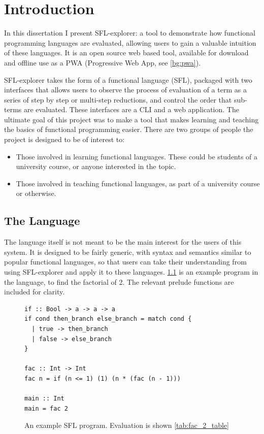 \chapter{Introduction}
\label{chap:context}
In this dissertation I present SFL-explorer: a tool to demonstrate how functional programming languages are evaluated, allowing users to gain a valuable intuition of these languages. It is an open source web based tool, available for download and offline use as a PWA (Progressive Web App, see \ref{bg:pwa}). 

SFL-explorer takes the form of a functional language (\ac{SFL}), packaged with two interfaces that allows users to observe the process of evaluation of a term as a series of step by step or multi-step reductions, and control the order that sub-terms are evaluated. These interfaces are a \ac{CLI} and a web application. The ultimate goal of this project was to make a tool that makes learning and teaching the basics of functional programming easier. There are two groups of people the project is designed to be of interest to:
\begin{itemize}
    \item Those involved in learning functional languages. These could be students of a university course, or anyone interested in the topic. 
    \item Those involved in teaching functional languages, as part of a university course or otherwise.
\end{itemize}

\section{The Language}
The language itself is not meant to be the main interest for the users of this system. It is designed to be fairly generic, with syntax and semantics similar to popular functional languages, so that users can take their understanding from using SFL-explorer and apply it to these languages. \ref{tab:fac_2_table_input} is an example program in the language, to find the factorial of 2. The relevant prelude functions are included for clarity.

\begin{figure}[h]
\begin{lstlisting}[language=SFL]
if :: Bool -> a -> a -> a
if cond then_branch else_branch = match cond {
  | true -> then_branch
  | false -> else_branch
}

fac :: Int -> Int
fac n = if (n <= 1) (1) (n * (fac (n - 1)))

main :: Int
main = fac 2
\end{lstlisting}
\caption{An example SFL program. Evaluation is shown \ref{tab:fac_2_table}}
\label{tab:fac_2_table_input}
\end{figure}

